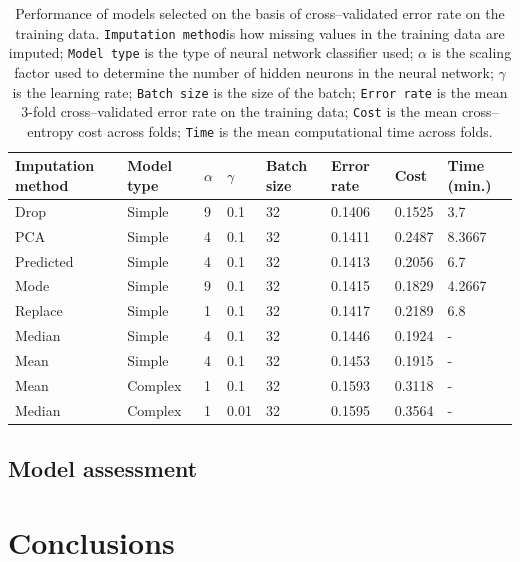 \documentclass[10pt,twocolumn,letterpaper]{article}
\begin{document}
\begin{table}[htbp]
\begin{center}
\begin{tabular}{llllllll}
\textbf{Imputation method} & \textbf{Model type} & \textbf{$\alpha$} & \textbf{$\gamma$} & \textbf{Batch size} & \textbf{Error rate} & \textbf{Cost} & \textbf{Time (min.)} \\
\hline
Drop & Simple & 9 & 0.1 & 32 & 0.1406 & 0.1525 & 3.7 \\
PCA & Simple & 4 & 0.1 & 32 & 0.1411 & 0.2487 & 8.3667 \\
Predicted & Simple & 4 & 0.1 & 32 & 0.1413 & 0.2056 & 6.7 \\
Mode & Simple & 9 & 0.1 & 32 & 0.1415 & 0.1829 & 4.2667 \\
Replace & Simple & 1 & 0.1 & 32 & 0.1417 & 0.2189 & 6.8 \\
Median & Simple & 4 & 0.1 & 32 & 0.1446 & 0.1924 & - \\
Mean & Simple & 4 & 0.1 & 32 & 0.1453 & 0.1915 & - \\
Mean & Complex & 1 & 0.1 & 32 & 0.1593 & 0.3118 & - \\
Median & Complex & 1 & 0.01 & 32 & 0.1595 & 0.3564 & - \\
\hline
\end{tabular}
\end{center}
\caption{Performance of models selected on the basis of cross--validated error rate on the training data. \texttt{Imputation method}is how missing values in the training data are imputed; \texttt{Model type} is the type of neural network classifier used; \texttt{$\alpha$} is the scaling factor used to determine the number of hidden neurons in the neural network; \texttt{$\gamma$} is the learning rate; \texttt{Batch size} is the size of the batch; \texttt{Error rate} is the mean 3-fold cross--validated error rate on the training data;  \texttt{Cost} is the mean cross--entropy cost across folds; \texttt{Time} is the mean computational time across folds. }
\label{tab:err-rates}
\end{table}

\subsection{Model assessment}

\section{Conclusions} \label{section:Con}


{\small


}
\end{document}
